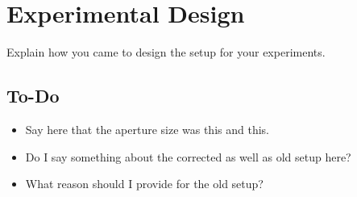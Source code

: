 \chapter{Experimental Design}

Explain how you came to design the setup for your experiments.

\section*{To-Do}
\begin{itemize}
    \item Say here that the aperture size was this and this.
    \item Do I say something about the corrected as well as old setup here?
    \item What reason should I provide for the old setup?
\end{itemize}